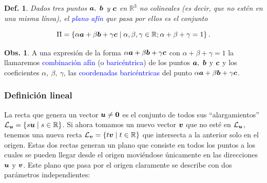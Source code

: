 \documentclass{article}
\theoremstyle{definicion}
\newtheorem{definicion}{Def.}
\theoremstyle{definition}             %
\theoremstyle{definition}             %
\theoremstyle{definition}
\theoremstyle{definition}
\theoremstyle{observacion}
\newtheorem{obs}{Obs.}
\theoremstyle{definition}
\theoremstyle{plain}
\theoremstyle{definition}
\theoremstyle{afirmacion}
\theoremstyle{notation}
\theoremstyle{definition}
\begin{document}


    \begin{definicion}
        Dados tres puntos \(\vb*{a},\ \vb*{b}\) y \(\vb*{c}\) en \(\mathbb{R}^{3}\) no colineales (es decir, que no estén en una misma línea), el \textcolor{blue}{plano afín} que pasa por ellos es el conjunto

        \begin{equation*}
            \Pi = \left\lbrace \alpha\vb*{a} + \beta\vb*{b} + \gamma\vb*{c} \mid \alpha, \beta, \gamma \in \mathbb{R}; \alpha + \beta + \gamma = 1\right\rbrace.
        \end{equation*}
    \end{definicion}

    \begin{obs}
        A una expresión de la forma \(\alpha\vb*{a} + \beta\vb*{b} + \gamma\vb*{c}\) con \(\alpha + \beta + \gamma = 1\) la llamaremos \textcolor{blue}{combinación afín} (o \textcolor{blue}{baricéntrica}) de los puntos \(\vb*{a},\ \vb*{b}\) y \(\vb*{c}\) y los coeficientes \(\alpha,\ \beta,\ \gamma\), las \textcolor{blue}{coordenadas baricéntricas} del punto \(\alpha\vb*{a} + \beta\vb*{b} + \gamma\vb*{c}\). 
    \end{obs}

    \subsubsection*{Definición lineal}

    La recta que genera un vector \(\vb*{u} \neq \vb*{0}\) es el conjunto de todos sus ``alargamientos'' \(\mathcal{L}_{\vb*{u}} = \left\lbrace s\vb*{u} \mid s \in \mathbb{R}\right\rbrace\). Si ahora tomamos un nuevo vector \(\vb*{v}\) que no esté en \(\mathcal{L}_{\vb*{u}}\), tenemos una nueva recta \(\mathcal{L}_{\vb*{v}} = \left\lbrace t\vb*{v} \mid t \in \mathbb{R}\right\rbrace\) que intersecta a la anterior solo en el origen. Estas dos rectas generan un plano que consiste en todos los puntos a los cuales se pueden llegar desde el origen moviéndose únicamente en las direcciones \(\vb*{u}\) y \(\vb*{v}\). Este plano que pasa por el origen claramente se describe con dos parámetros independientes:
\end{document}
